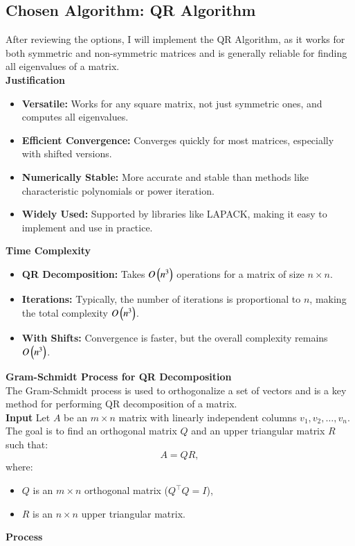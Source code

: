 \documentclass[journal]{IEEEtran}
\begin{document}
\begin{enumerate}
\section{Chosen Algorithm: QR Algorithm}
After reviewing the options, I will implement the QR Algorithm, as it works for both symmetric and non-symmetric matrices and is generally reliable for finding all eigenvalues of a matrix.\\
\textbf{Justification} 
\begin{itemize}
\item \textbf{Versatile:} Works for any square matrix, not just symmetric ones, and computes all eigenvalues.
\item \textbf{Efficient Convergence:} Converges quickly for most matrices, especially with shifted versions.
\item \textbf{Numerically Stable:} More accurate and stable than methods like characteristic polynomials or power iteration.
\item \textbf{Widely Used:} Supported by libraries like LAPACK, making it easy to implement and use in practice.
\end{itemize}
\textbf{Time Complexity}
\begin{itemize}
\item \textbf{QR Decomposition: }Takes $O\left(n^3\right)$ operations for a matrix of size $n \times n$.
\item \textbf{Iterations:} Typically, the number of iterations is proportional to $n$, making the total complexity $O\left(n^3\right)$.
\item \textbf{With Shifts:} Convergence is faster, but the overall complexity remains $O\left(n^3\right)$.
\end{itemize}
\textbf{Gram-Schmidt Process for QR Decomposition}\\
The Gram-Schmidt process is used to orthogonalize a set of vectors and is a key method for performing QR decomposition of a matrix.\\
\textbf{Input}
Let $A$ be an $m \times n$ matrix with linearly independent columns $v_1, v_2, \ldots, v_n$. The goal is to find an orthogonal matrix $Q$ and an upper triangular matrix $R$ such that:
\[
A = QR,
\]
where:
\begin{itemize}
    \item $Q$ is an $m \times n$ orthogonal matrix ($Q^\top Q = I$),
    \item $R$ is an $n \times n$ upper triangular matrix.
\end{itemize}
\textbf{Process}\\

\end{enumerate}
\end{document}

